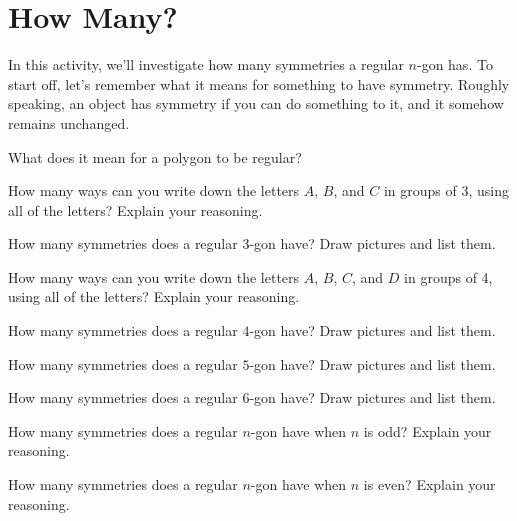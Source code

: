 \newpage
\section{How Many?} 
                                  

In this activity, we'll investigate how many symmetries a regular
$n$-gon has.  To start off, let's remember what it means for
something to have symmetry. Roughly speaking, an object has symmetry
if you can do something to it, and it somehow remains unchanged.

\begin{prob}
What does it mean for a polygon to be regular?
\end{prob}

\begin{prob}
How many ways can you write down the letters $A$, $B$, and $C$ in
groups of 3, using all of the letters? Explain your reasoning.
\end{prob}

\begin{prob}
How many symmetries does a regular $3$-gon have? Draw pictures and
list them.
\end{prob}

\begin{prob}
How many ways can you write down the letters $A$, $B$, $C$, and $D$ in
groups of 4, using all of the letters? Explain your reasoning.
\end{prob}

\begin{prob}
How many symmetries does a regular $4$-gon have? Draw pictures and
list them.
\end{prob}

\begin{prob}
How many symmetries does a regular $5$-gon have? Draw pictures and
list them.
\end{prob}

\begin{prob}
How many symmetries does a regular $6$-gon have? Draw pictures and
list them.
\end{prob}

\begin{prob}
How many symmetries does a regular $n$-gon have when $n$ is odd?
Explain your reasoning.
\end{prob}

\begin{prob}
How many symmetries does a regular $n$-gon have when $n$ is even?
Explain your reasoning.
\end{prob}




